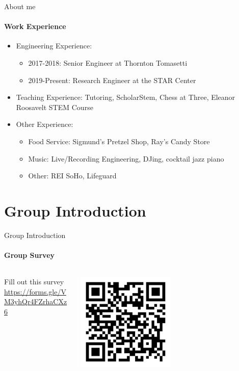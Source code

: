 \documentclass[
    aspectratio=169, 
    usepdftitle=false, 
    xcolor={dvipsnames},
    hyperref={
        colorlinks,
        linkcolor=black,
        urlcolor=blue}
    ]{beamer}
\begin{document}
\begin{frame}{About me}
    \framesubtitle{Work Experience}
    \begin{itemize}
        \item Engineering Experience: 
        \begin{itemize}
            \item 2017-2018: Senior Engineer at Thornton Tomasetti
            \item 2019-Present: Research Engineer at the STAR Center
        \end{itemize}
        \item Teaching Experience: Tutoring, ScholarStem, Chess at Three, Eleanor Roosavelt STEM Course
        \item Other Experience: 
        \begin{itemize} 
            \item Food Service: Sigmund's Pretzel Shop, Ray's Candy Store
            \item Music: Live/Recording Engineering, DJing, cocktail jazz piano
            \item Other: REI SoHo, Lifeguard
        \end{itemize}
    \end{itemize}
\end{frame}

\section{Group Introduction}
\begin{frame}{Group Introduction}
    \framesubtitle{Group Survey}

    \begin{columns}
        \begin{column}{0.5\textwidth}
            \begin{block}{Fill out this survey}
                \url{https://forms.gle/VM3yhQr4FZrhaCXz6}
            \end{block}
        \end{column}
        \begin{column}{0.5\textwidth}  %
            \begin{center}
             \includegraphics[width=0.5\textwidth]{qr-code.pdf}
             \end{center}
        \end{column}
    \end{columns}
\end{frame}
\end{document}
